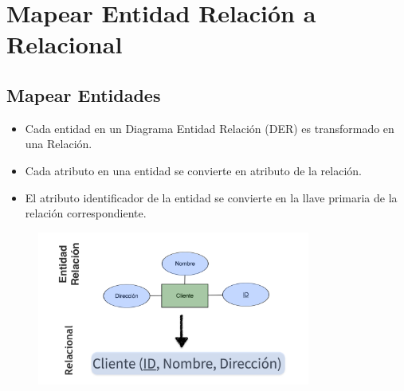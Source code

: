 \documentclass[12pt, fleqn]{report}                             %
\begin{document}
        \clearpage
        \section{Mapear Entidad Relación a Relacional}

            
            \subsection{Mapear Entidades}

                \begin{itemize}
                    \item Cada entidad en un Diagrama Entidad Relación (DER) es transformado en
                        una Relación.

                    \item Cada atributo en una entidad se convierte en atributo de la relación.

                    \item El atributo identificador de la entidad se convierte en la llave primaria
                        de la relación correspondiente.
                \end{itemize}

                \begin{figure}[h]
                    \centering
                    \includegraphics[width=0.8\textwidth]{MapeoEntidad}
                \end{figure}


            \clearpage
\end{document}
